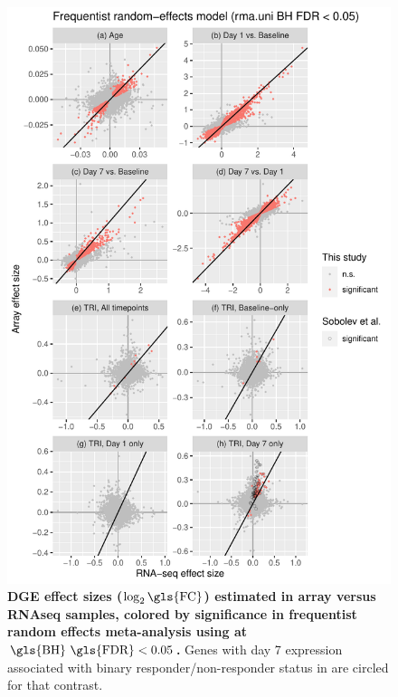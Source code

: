 \begin{figure}
    \includegraphics[width=1.0\textwidth,page=1]{mainmatter/figures/chapter_02/plot_dge_eqtl.DGE.effectSizeComparison.pdf}
    \caption{
        \textbf{\gls{DGE} effect sizes ($\log_2\text{\gls{FC}}$) estimated in array versus \gls{RNAseq} samples, colored by significance in frequentist random effects meta-analysis using  at $\text{\gls{BH} \gls{FDR}} < 0.05$.}
    Genes with day 7 expression associated with binary responder/non-responder status in \textcite{sobolev2016AdjuvantedInfluenzaH1N1Vaccination} are circled for that contrast.
    }
    \label{fig:hird_DGE_effectSizeComparisons_rma}
\end{figure}

